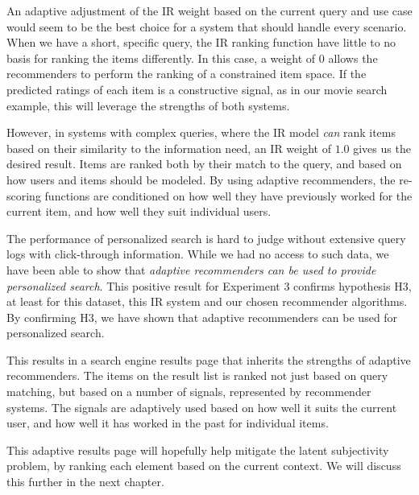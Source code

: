 An adaptive adjustment of the IR weight based on the current query and use case
would seem to be the best choice for a system that should handle every scenario.
When we have a short, specific query, the IR ranking function have little to
no basis for ranking the items differently.
In this case, a weight of $0$ allows the recommenders to perform the ranking
of a constrained item space.
If the predicted ratings of each item is a constructive signal,
as in our movie search example, this will leverage the strengths of both systems.

However, in systems with complex queries, where the IR model
\emph{can} rank items based on their similarity to the information need,
an IR weight of $1.0$ gives us the desired result.
Items are ranked both by their match to the query,
and based on how users and items should be modeled.
By using adaptive recommenders, the re-scoring functions
are conditioned
on how well they have previously worked for the current item,
and how well they suit individual users.

The performance of personalized search is hard to judge without
extensive query logs with click-through information.
While we had no access to such data, 
we have been able to show that \emph{adaptive recommenders
can be used to provide personalized search}.
This positive result for Experiment 3 confirms hypothesis H3,
at least for this dataset, this IR system and our chosen recommender algorithms.
By confirming H3, we have shown that adaptive recommenders can be used for personalized search.

This results in a search engine results page that inherits the strengths of adaptive recommenders.
The items on the result list is ranked not just based on query matching,
but based on a number of signals, represented by recommender systems.
The signals are adaptively used based on how well it suits the current user,
and how well it has worked in the past for individual items.

This adaptive results page will hopefully help mitigate the latent subjectivity problem,
by ranking each element based on the current context.
We will discuss this further in the next chapter.


